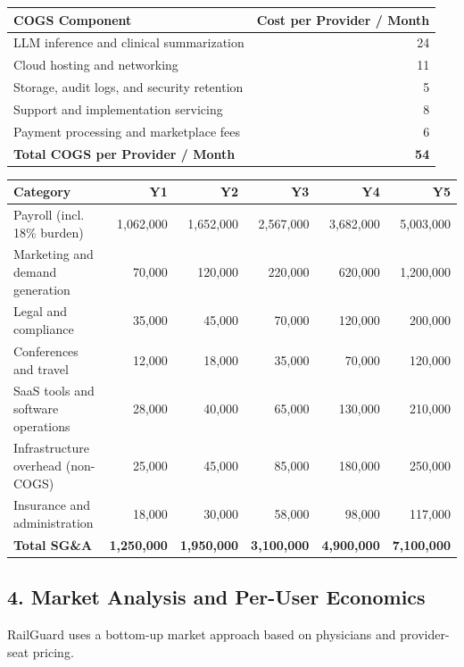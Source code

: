 \documentclass[11pt]{article}
\begin{document}
\begin{center}
\begin{tabular}{p{} r}
\toprule
\textbf{COGS Component} & \textbf{Cost per Provider / Month} \\
\midrule
LLM inference and clinical summarization & 24 \\
Cloud hosting and networking & 11 \\
Storage, audit logs, and security retention & 5 \\
Support and implementation servicing & 8 \\
Payment processing and marketplace fees & 6 \\
\midrule
\textbf{Total COGS per Provider / Month} & \textbf{54} \\
\bottomrule
\end{tabular}
\end{center}

\begin{center}
\begin{tabular}{lrrrrr}
\toprule
\textbf{Category} & \textbf{Y1} & \textbf{Y2} & \textbf{Y3} & \textbf{Y4} & \textbf{Y5} \\
\midrule
Payroll (incl. 18\% burden) & 1,062,000 & 1,652,000 & 2,567,000 & 3,682,000 & 5,003,000 \\
Marketing and demand generation & 70,000 & 120,000 & 220,000 & 620,000 & 1,200,000 \\
Legal and compliance & 35,000 & 45,000 & 70,000 & 120,000 & 200,000 \\
Conferences and travel & 12,000 & 18,000 & 35,000 & 70,000 & 120,000 \\
SaaS tools and software operations & 28,000 & 40,000 & 65,000 & 130,000 & 210,000 \\
Infrastructure overhead (non-COGS) & 25,000 & 45,000 & 85,000 & 180,000 & 250,000 \\
Insurance and administration & 18,000 & 30,000 & 58,000 & 98,000 & 117,000 \\
\midrule
\textbf{Total SG\&A} & \textbf{1,250,000} & \textbf{1,950,000} & \textbf{3,100,000} & \textbf{4,900,000} & \textbf{7,100,000} \\
\bottomrule
\end{tabular}
\end{center}

\subsection*{4. Market Analysis and Per-User Economics}
RailGuard uses a bottom-up market approach based on physicians and provider-seat pricing.
\end{document}
